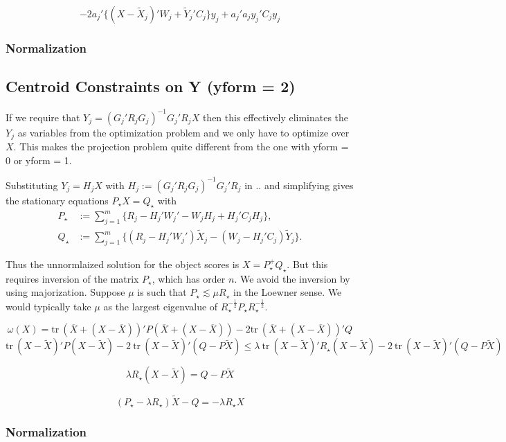 \documentclass[
  12pt,
]{article}
\begin{document}
\[
-2a_j'\{(X-\tilde X_j)'W_j+\tilde Y_j'C_j\}y_j+a_j'a_jy_j'C_jy_j
\]

\subsubsection{Normalization}\label{normalization}

\subsection{Centroid Constraints on Y (yform = 2)}\label{centroid-constraints-on-y-yform-2}

If we require that \(Y_j=(G_j'R_jG_j)^{-1}G_j'R_jX\) then this effectively eliminates the \(Y_j\) as variables from the optimization problem and we only have to optimize over \(X\). This makes the projection problem
quite different from the one with yform = 0 or yform = 1.

Substituting \(Y_j=H_jX\) with \(H_j:=(G_j'R_jG_j)^{-1}G_j'R_j\) in .. and simplifying gives
the stationary equations \(P_\star X= Q_\star\) with
\begin{subequations}
\begin{align}
P_\star&:=\sum_{j=1}^m\{R_j-H_j'W_j'-W_jH_j+H_j'C_jH_j\},\\
Q_\star&:=\sum_{j=1}^m\{(R_j-H_j'W_j')\tilde X_j-(W_j-H_j'C_j)\tilde Y_j\}.
\end{align}
\end{subequations}

Thus the unnormlaized solution for the object scores is \(X=P^+_\star Q_\star\). But this requires inversion of the matrix \(P_\star\), which has order \(n\). We avoid the inversion by using majorization. Suppose \(\mu\) is such that \(P_\star\lesssim\mu R_\star\) in the Loewner sense. We would typically take \(\mu\) as the
largest eigenvalue of \(R_\star^{-\frac12}P_\star R_\star^{-\frac12}\).

\[\omega(X)=\text{tr}\ (\overline X+(X-\overline X))'P(\overline X+(X-\overline X))-2\text{tr}\ (\overline X+(X-\overline X))'Q\]
\[
\text{tr}\ (X-\tilde X)'P(X-\tilde X)-2\ \text{tr}\ (X-\tilde X)'(Q-P\tilde X)\leq
\lambda\ \text{tr}\ (X-\tilde X)'R_\star(X-\tilde X)-2\ \text{tr}\ (X-\tilde X)'(Q-P\tilde X)
\]

\[
\lambda R_\star(X-\tilde X)=Q-P\tilde X
\]

\[
(P_\star-\lambda R_\star)\tilde X-Q=-\lambda R_\star X
\]

\subsubsection{Normalization}\label{normalization-1}
\end{document}

